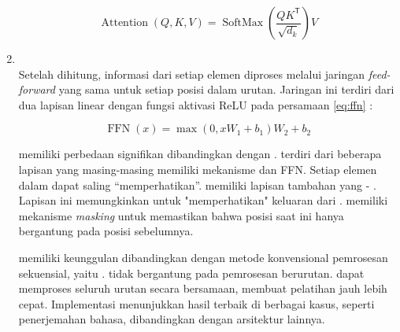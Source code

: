 \begin{enumerate}
	      \begin{equation}
		      \label{eq:attention-softmax}
		      \operatorname{Attention}(Q, K, V) = \operatorname{SoftMax}\left(\frac{QK^\mathsf{T}}{\sqrt{d_k}}\right)V
	      \end{equation}

	\item \ffnfull~\\
	      Setelah \attention{} dihitung, informasi dari setiap elemen diproses melalui jaringan \emph{feed-forward} yang sama untuk setiap posisi dalam urutan. Jaringan ini terdiri dari dua lapisan linear dengan fungsi aktivasi ReLU pada persamaan \eqref{eq:ffn} \parencite{vaswani2017attention}:

	      \begin{equation}
		      \label{eq:ffn}
		      \operatorname{FFN}(x) = \max(0, xW_1 + b_1)W_2 + b_2
	      \end{equation}

	      \decoderfl{} memiliki perbedaan signifikan dibandingkan dengan \encoder.
	      \encoderfl{} terdiri dari beberapa lapisan yang masing-masing memiliki mekanisme \selfattention{} dan FFN. Setiap elemen dalam \sequence{} dapat saling “memperhatikan”. \decoderfl{} memiliki lapisan tambahan yang \encoder{}\--\decoder{} \attention. Lapisan ini memungkinkan \decoder{} untuk "memperhatikan" keluaran dari \encoder. \decoderfl{} memiliki mekanisme \emph{masking} untuk memastikan bahwa posisi saat ini hanya bergantung pada posisi sebelumnya.

	      \transformer{} memiliki keunggulan dibandingkan dengan metode konvensional pemrosesan sekuensial, yaitu \rnn. \transformer{} tidak bergantung
	      pada pemrosesan berurutan. \transformer{} dapat memproses seluruh urutan secara bersamaan, membuat pelatihan jauh lebih cepat. Implementasi \transformer{} menunjukkan hasil terbaik di berbagai kasus, seperti penerjemahan bahasa,
	      dibandingkan dengan arsitektur lainnya.

\end{enumerate}
